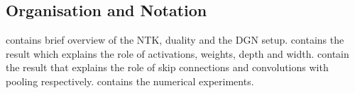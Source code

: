 \subsection{Organisation and Notation}
 contains brief overview of the NTK, duality and the DGN setup.  contains the result which explains the role of activations, weights, depth and width.  contain the result that explains the role of skip connections and convolutions with pooling respectively.  contains the numerical experiments.

